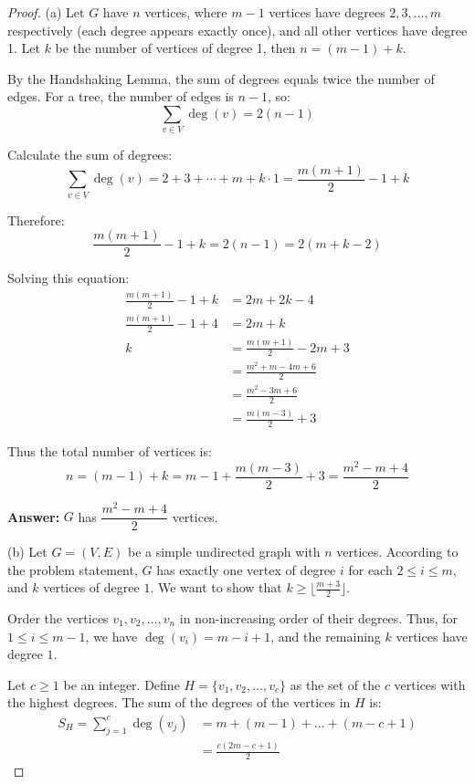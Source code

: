 \documentclass[11pt, a4paper]{ctexrep}
\begin{document}
\begin{proof}
    (a) Let $G$ have $n$ vertices, where $m-1$ vertices have degrees $2, 3, \ldots, m$ respectively (each degree appears exactly once), and all other vertices have degree 1. Let $k$ be the number of vertices of degree 1, then $n = (m-1) + k$.

    By the Handshaking Lemma, the sum of degrees equals twice the number of edges. For a tree, the number of edges is $n-1$, so:
    \[
        \sum_{v \in V} \deg(v) = 2(n-1)
    \]

    Calculate the sum of degrees:
    \[
        \sum_{v \in V} \deg(v) = 2 + 3 + \cdots + m + k \cdot 1 = \frac{m(m+1)}{2} - 1 + k
    \]

    Therefore:
    \[
        \frac{m(m+1)}{2} - 1 + k = 2(n-1) = 2(m + k - 2)
    \]

    Solving this equation:
    \begin{align*}
        \frac{m(m+1)}{2} - 1 + k & = 2m + 2k - 4                \\
        \frac{m(m+1)}{2} - 1 + 4 & = 2m + k                     \\
        k                        & = \frac{m(m+1)}{2} - 2m + 3  \\
                                 & = \frac{m^2 + m - 4m + 6}{2} \\
                                 & = \frac{m^2 - 3m + 6}{2}     \\
                                 & = \frac{m(m-3)}{2} + 3
    \end{align*}

    Thus the total number of vertices is:
    \[
        n = (m-1) + k = m - 1 + \frac{m(m-3)}{2} + 3 = \frac{m^2 - m + 4}{2}
    \]

    \textbf{Answer:} $G$ has $\dfrac{m^2 - m + 4}{2}$ vertices.

    (b)
    Let $G = (V, E)$ be a simple undirected graph with $n$ vertices. According to the problem statement, $G$ has exactly one vertex of degree $i$ for each $2 \leq i \leq m$, and $k$ vertices of degree $1$. We want to show that $k \geq \lfloor \frac{m+3}{2} \rfloor$.

    Order the vertices $v_1, v_2, \dots, v_n$ in non-increasing order of their degrees. Thus, for $1 \leq i \leq m-1$, we have $\deg(v_i) = m - i + 1$, and the remaining $k$ vertices have degree $1$.

    Let $c \geq 1$ be an integer. Define $H = \{v_1, v_2, \dots, v_c\}$ as the set of the $c$ vertices with the highest degrees. The sum of the degrees of the vertices in $H$ is:
    \begin{align*}
        S_H = \sum_{j=1}^c \deg(v_j) & = m + (m-1) + \dots + (m-c+1) \\
                                     & = \frac{c(2m - c + 1)}{2}
    \end{align*}


\end{proof}
\end{document}

